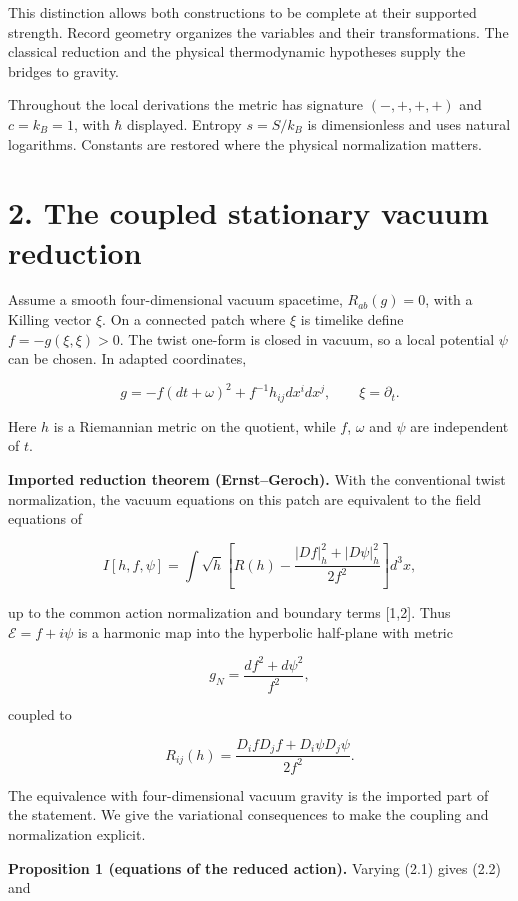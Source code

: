 \documentclass[
  11pt,
  a4paper,
]{article}
\begin{document}
This distinction allows both constructions to be complete at their supported strength. Record geometry organizes the variables and their transformations. The classical reduction and the physical thermodynamic hypotheses supply the bridges to gravity.

Throughout the local derivations the metric has signature \((-,+,+,+)\) and \(c=k_B=1\), with \(\hbar\) displayed. Entropy \(s=S/k_B\) is dimensionless and uses natural logarithms. Constants are restored where the physical normalization matters.

\section{2. The coupled stationary vacuum reduction}\label{the-coupled-stationary-vacuum-reduction}

Assume a smooth four-dimensional vacuum spacetime, \(R_{ab}(g)=0\), with a Killing vector \(\xi\). On a connected patch where \(\xi\) is timelike define \(f=-g(\xi,\xi)>0\). The twist one-form is closed in vacuum, so a local potential \(\psi\) can be chosen. In adapted coordinates,

\[
g=-f(dt+\omega)^2+f^{-1}h_{ij}dx^i dx^j,
\qquad \xi=\partial_t.
\]

Here \(h\) is a Riemannian metric on the quotient, while \(f\), \(\omega\) and \(\psi\) are independent of \(t\).

\textbf{Imported reduction theorem (Ernst--Geroch).} With the conventional twist normalization, the vacuum equations on this patch are equivalent to the field equations of

\[
I[h,f,\psi]=\int\sqrt h\left[
R(h)-\frac{|Df|_h^2+|D\psi|_h^2}{2f^2}\right]d^3x,
\tag{2.1}
\]

up to the common action normalization and boundary terms {[}1,2{]}. Thus \(\mathcal E=f+i\psi\) is a harmonic map into the hyperbolic half-plane with metric

\[
g_N=\frac{df^2+d\psi^2}{f^2},
\]

coupled to

\[
R_{ij}(h)=\frac{D_i fD_j f+D_i\psi D_j\psi}{2f^2}.
\tag{2.2}
\]

The equivalence with four-dimensional vacuum gravity is the imported part of the statement. We give the variational consequences to make the coupling and normalization explicit.

\textbf{Proposition 1 (equations of the reduced action).} Varying (2.1) gives (2.2) and
\end{document}
